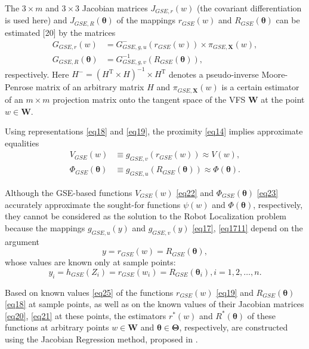 \documentclass[conference]{IEEEtran} %
\def\mbW{\mathbf{W}}
\def\mbTheta{{\bm\Theta}}
\def\mbtheta{{\bm\theta}}
\def\mbX{\mathbf{X}}
\begin{document}
The $3\times m$ and $3\times3$ Jacobian matrices $J_{GSE,r}(w)$ (the covariant differentiation is used here) and $J_{GSE,R}(\mbtheta)$ of the mappings $r_{GSE}(w)$ and $R_{GSE}(\mbtheta)$ can be estimated [20] by the matrices
\begin{align}
\label{eq20}
	G_{GSE,r}(w) &= G_{GSE,g,u}^- (r_{GSE}(w)) \times \pi_{GSE,\mbX}(w),	\\
    \label{eq21}
	G_{GSE,R}(\mbtheta) &= G_{GSE,g,v}^{-1} (R_{GSE}(\mbtheta)),
\end{align}
respectively. Here $H^{-} = (H^{\mathrm{T}}\times H)^{-1}\times H^{\mathrm{T}}$ denotes a pseudo-inverse Moore-Penrose matrix \cite{bib28} of an arbitrary matrix $H$ and $\pi_{GSE,\mbX}(w)$ is a certain estimator \cite{bib20} of an $m\times m$ projection matrix onto the tangent space of the VFS $\mbW$ at the point $w \in \mbW$.

Using representations \eqref{eq18} and \eqref{eq19}, the proximity \eqref{eq14} implies  approximate equalities
\begin{align}
\label{eq22}
	V_{GSE}(w) &\equiv g_{GSE,v}(r_{GSE}(w)) \approx V(w),\\
    \label{eq23}
	\Phi_{GSE}(\mbtheta) &\equiv g_{GSE,u}(R_{GSE}(\mbtheta)) \approx \Phi(\mbtheta).
\end{align}

Although the GSE-based functions $V_{GSE}(w)$ \eqref{eq22} and $\Phi_{GSE}(\mbtheta)$ \eqref{eq23} accurately approximate the sought-for functions $\psi(w)$ and $\Phi(\mbtheta)$, respectively, they cannot be considered as the solution to the Robot Localization problem because the mappings $g_{GSE,u}(y)$ and $g_{GSE,v}(y)$ \eqref{eq17}, \eqref{eq1711} depend on the argument
\begin{equation}
\label{eq24}
	y = r_{GSE}(w) = R_{GSE}(\mbtheta),
\end{equation}
whose values are known only at sample points:
\begin{equation}
\label{eq25}
	y_i = h_{GSE}(Z_i) = r_{GSE}(w_i) = R_{GSE}(\mbtheta_i), i = 1, 2, \ldots , n.
\end{equation}

Based on known values \eqref{eq25} of the functions $r_{GSE}(w)$ \eqref{eq19} and $R_{GSE}(\mbtheta)$ \eqref{eq18} at sample points, as well as on the known values of their Jacobian matrices \eqref{eq20}, \eqref{eq21} at these points, the estimators $r^*(w)$ and $R^*(\mbtheta)$ of these functions at arbitrary points $w \in \mbW$ and $\mbtheta\in\mbTheta$, respectively, are constructed using the Jacobian Regression method, proposed in \cite{bib29}.
\end{document}
